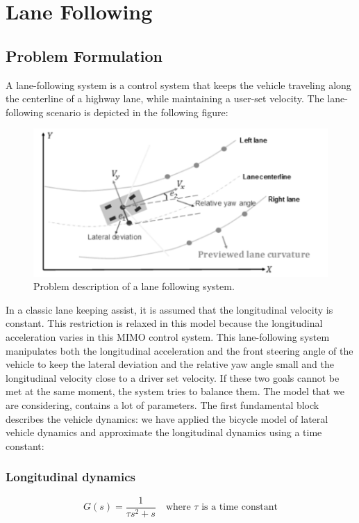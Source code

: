 \documentclass[conference, 11pt]{IEEEtran}
\begin{document}
\section{Lane Following}
\subsection{Problem Formulation}
A lane-following system is a control system that keeps the vehicle traveling along the centerline of a highway lane, while maintaining a user-set velocity. The lane-following scenario is depicted in the following figure:
\begin{figure}[!h]
	\centering
	\includegraphics[width=1\columnwidth]{./figure/laneFollowing.pdf}
	\caption{Problem description of a lane following system.}
	\label{fig:laneFollowing}
\end{figure}

In a classic lane keeping assist, it is assumed that the longitudinal velocity is constant. This restriction is relaxed in this model because the longitudinal acceleration varies in this MIMO control system. This lane-following system manipulates both the longitudinal acceleration and the front steering angle of the vehicle to keep the lateral deviation and the relative yaw angle small and the longitudinal velocity close to a driver set velocity. If these two goals cannot be met at the same moment, the system tries to balance them. The model that we are considering, contains a lot of parameters. The first fundamental block describes the vehicle dynamics: we have applied the bicycle model of lateral vehicle dynamics and approximate the longitudinal dynamics using a time constant:
\subsubsection{Longitudinal dynamics}
\begin{equation}
	\label{eqn:longi_dynamics_simple_model}
	G(s)=\frac{1}{\tau s^2+s} \quad \text{where $\tau$ is a time constant}
\end{equation}
\end{document}
